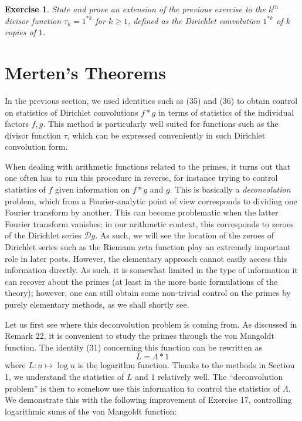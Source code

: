 \documentclass[10pt,reqno]{amsart}
\newtheorem{exercise}[theorem]{Exercise}
\begin{document}
\begin{exercise}
    State and prove an extension of the previous exercise to the $k^{th}$ divisor function $\tau_k = 1^{*k}$ for $k \geq 1$, defined as the Dirichlet convolution $1^{*k}$ of $k$ copies of $1$.
\end{exercise}

\section{Merten's Theorems}

In the previous section, we used identities such as (35) and (36) to obtain control on statistics of Dirichlet convolutions $f * g$ in terms of statistics of the individual factors $f, g$. This method is particularly well suited for functions such as the divisor function $\tau$, which can be expressed conveniently in such Dirichlet convolution form.

When dealing with arithmetic functions related to the primes, it turns out that one often has to run this procedure in reverse, for instance trying to control statistics of $f$ given information on $f*g$ and $g$. This is basically a \emph{deconvolution} problem, which from a Fourier-analytic point of view corresponds to dividing one Fourier transform by another. This can become problematic when the latter Fourier transform vanishes; in our arithmetic context, this corresponds to zeroes of the Dirichlet series ${\mathcal D} g$. As such, we will see the location of the zeroes of Dirichlet series such as the Riemann zeta function play an extremely important role in later posts. However, the elementary approach cannot easily access this information directly. As such, it is somewhat limited in the type of information it can recover about the primes (at least in the more basic formulations of the theory); however, one can still obtain some non-trivial control on the primes by purely elementary methods, as we shall shortly see.

Let us first see where this deconvolution problem is coming from. As discussed in Remark 22, it is convenient to study the primes through the von Mangoldt function. The identity (31) concerning this function can be rewritten as
%
\begin{equation}   L = \Lambda * 1 \end{equation}
%
where $L: n \mapsto \log n$ is the logarithm function. Thanks to the methods in Section 1, we understand the statistics of $L$ and $1$ relatively well. The “deconvolution problem” is then to somehow use this information to control the statistics of $\Lambda$. We demonstrate this with the following improvement of Exercise 17, controlling logarithmic sums of the von Mangoldt function:
\end{document}
